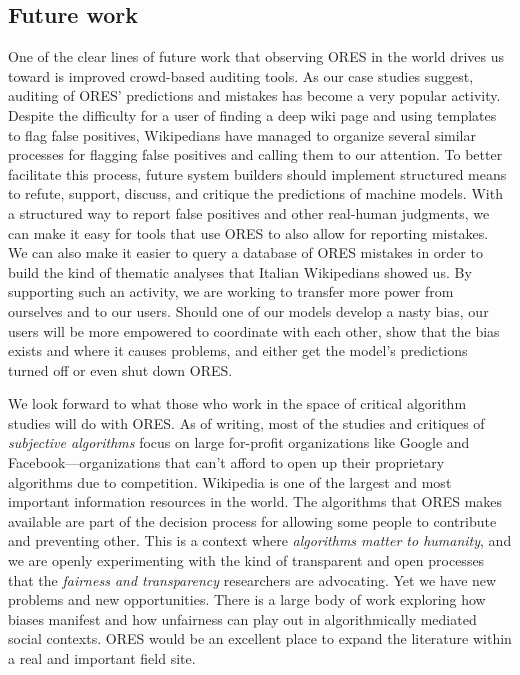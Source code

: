\subsection{Future work}
One of the clear lines of future work that observing ORES in the world drives us toward is improved crowd-based auditing tools.  As our case studies suggest, auditing of ORES' predictions and mistakes has become a very popular activity.  Despite the difficulty for a user of finding a deep wiki page and using templates to flag false positives, Wikipedians have managed to organize several similar processes for flagging false positives and calling them to our attention.  To better facilitate this process, future system builders should implement structured means to refute, support, discuss, and critique the predictions of machine models.  With a structured way to report false positives and other real-human judgments, we can make it easy for tools that use ORES to also allow for reporting mistakes.  We can also make it easier to query a database of ORES mistakes in order to build the kind of thematic analyses that Italian Wikipedians showed us.  By supporting such an activity, we are working to transfer more power from ourselves and to our users.  Should one of our models develop a nasty bias, our users will be more empowered to coordinate with each other, show that the bias exists and where it causes problems, and either get the model's predictions turned off or even shut down ORES.

We look forward to what those who work in the space of critical algorithm studies will do with ORES.  As of writing, most of the studies and critiques of \emph{subjective algorithms}\cite{tufekci2015algorithms} focus on large for-profit organizations like Google and Facebook---organizations that can't afford to open up their proprietary algorithms due to competition.  Wikipedia is one of the largest and most important information resources in the world.  The algorithms that ORES makes available are part of the decision process for allowing some people to contribute and preventing other.  This is a context where \emph{algorithms matter to humanity}, and we are openly experimenting with the kind of transparent and open processes that the \emph{fairness and transparency} researchers are advocating.  Yet we have new problems and new opportunities.  There is a large body of work exploring how biases manifest and how unfairness can play out in algorithmically mediated social contexts.  ORES would be an excellent place to expand the literature within a real and important field site.

